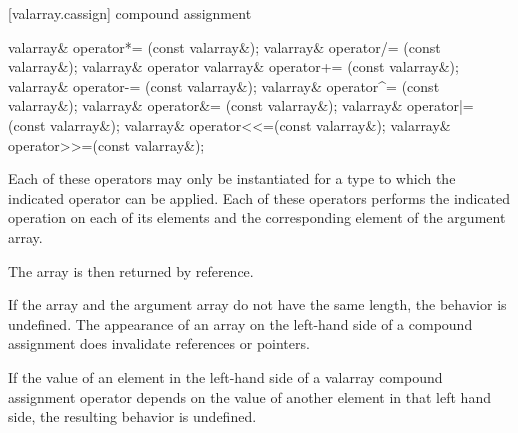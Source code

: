 [valarray.cassign]{ compound assignment}

%
%
%
%
%
%
%
%
%
%
%
%
\begin{itemdecl}
valarray& operator*= (const valarray&);
valarray& operator/= (const valarray&);
valarray& operator%
valarray& operator+= (const valarray&);
valarray& operator-= (const valarray&);
valarray& operator^= (const valarray&);
valarray& operator&= (const valarray&);
valarray& operator|= (const valarray&);
valarray& operator<<=(const valarray&);
valarray& operator>>=(const valarray&);
\end{itemdecl}

\begin{itemdescr}
\pnum
Each of these operators may only be instantiated for a type 
to which the indicated operator can be applied.
Each of these operators
performs the indicated operation on each of its elements and the
corresponding element of the argument array.

\pnum
The array is then returned by reference.

\pnum
If the array and the
argument array do not have the same length, the behavior is undefined.%
The appearance of an array on the left-hand side of a compound assignment
does  invalidate references or pointers.

\pnum
If the value of an element in the left-hand side of a valarray compound
assignment operator depends on the value of another element in that left
hand side, the resulting behavior is undefined.
\end{itemdescr}

